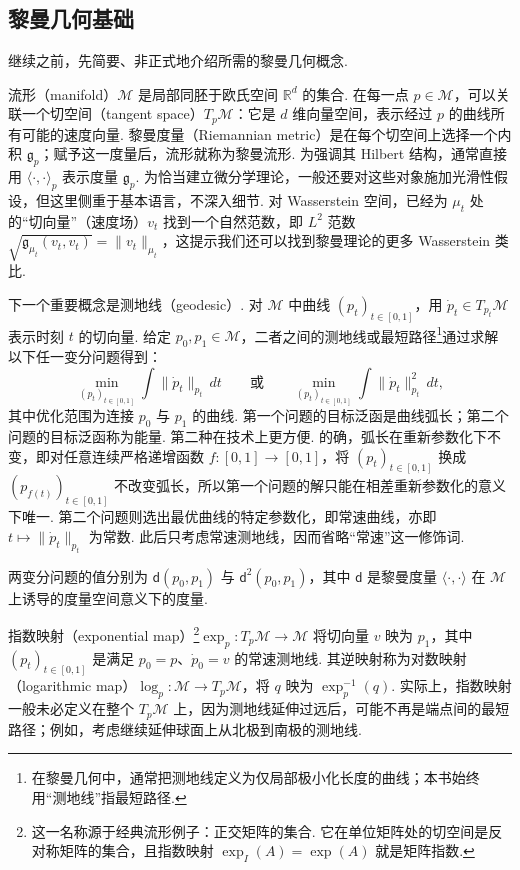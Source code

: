 \subsection{黎曼几何基础}\label{sec:5.2}

继续之前，先简要、非正式地介绍所需的黎曼几何概念.

流形（manifold）$\mathcal M$ 是局部同胚于欧氏空间 $\mathbb R^d$ 的集合. 在每一点 $p\in\mathcal M$，可以关联一个切空间（tangent space）$T_p\mathcal M$：它是 $d$ 维向量空间，表示经过 $p$ 的曲线所有可能的速度向量. 黎曼度量（Riemannian metric）是在每个切空间上选择一个内积 $\mathfrak g_p$；赋予这一度量后，流形就称为黎曼流形. 为强调其 Hilbert 结构，通常直接用 $\langle\cdot,\cdot\rangle_p$ 表示度量 $\mathfrak g_p$. 为恰当建立微分学理论，一般还要对这些对象施加光滑性假设，但这里侧重于基本语言，不深入细节. 对 Wasserstein 空间，已经为 $\mu_t$ 处的“切向量”（速度场）$v_t$ 找到一个自然范数，即 $L^2$ 范数 $\sqrt{\mathfrak g_{\mu_t}(v_t,v_t)}=\|v_t\|_{\mu_t}$，这提示我们还可以找到黎曼理论的更多 Wasserstein 类比.

下一个重要概念是测地线（geodesic）. 对 $\mathcal M$ 中曲线 $(p_t)_{t\in[0,1]}$，用 $\dot p_t\in T_{p_t}\mathcal M$ 表示时刻 $t$ 的切向量. 给定 $p_0,p_1\in\mathcal M$，二者之间的测地线或最短路径\footnote{在黎曼几何中，通常把测地线定义为仅局部极小化长度的曲线；本书始终用“测地线”指最短路径.}通过求解以下任一变分问题得到：
$$
\min_{(p_t)_{t\in[0,1]}}\int\|\dot p_t\|_{p_t}\,dt
\qquad\text{或}\qquad
\min_{(p_t)_{t\in[0,1]}}\int\|\dot p_t\|_{p_t}^2\,dt,
$$
其中优化范围为连接 $p_0$ 与 $p_1$ 的曲线. 第一个问题的目标泛函是曲线弧长；第二个问题的目标泛函称为能量. 第二种在技术上更方便. 的确，弧长在重新参数化下不变，即对任意连续严格递增函数 $f:[0,1]\to[0,1]$，将 $(p_t)_{t\in[0,1]}$ 换成 $(p_{f(t)})_{t\in[0,1]}$ 不改变弧长，所以第一个问题的解只能在相差重新参数化的意义下唯一. 第二个问题则选出最优曲线的特定参数化，即常速曲线，亦即 $t\mapsto\|\dot p_t\|_{p_t}$ 为常数. 此后只考虑常速测地线，因而省略“常速”这一修饰词.

两变分问题的值分别为 $\mathsf d(p_0,p_1)$ 与 $\mathsf d^2(p_0,p_1)$，其中 $\mathsf d$ 是黎曼度量 $\langle\cdot,\cdot\rangle$ 在 $\mathcal M$ 上诱导的度量空间意义下的度量.

指数映射（exponential map）\footnote{这一名称源于经典流形例子：正交矩阵的集合. 它在单位矩阵处的切空间是反对称矩阵的集合，且指数映射 $\exp_I(A)=\exp(A)$ 就是矩阵指数.}$\exp_p:T_p\mathcal M\to\mathcal M$ 将切向量 $v$ 映为 $p_1$，其中 $(p_t)_{t\in[0,1]}$ 是满足 $p_0=p$、$\dot p_0=v$ 的常速测地线. 其逆映射称为对数映射（logarithmic map）$\log_p:\mathcal M\to T_p\mathcal M$，将 $q$ 映为 $\exp_p^{-1}(q)$. 实际上，指数映射一般未必定义在整个 $T_p\mathcal M$ 上，因为测地线延伸过远后，可能不再是端点间的最短路径；例如，考虑继续延伸球面上从北极到南极的测地线.

